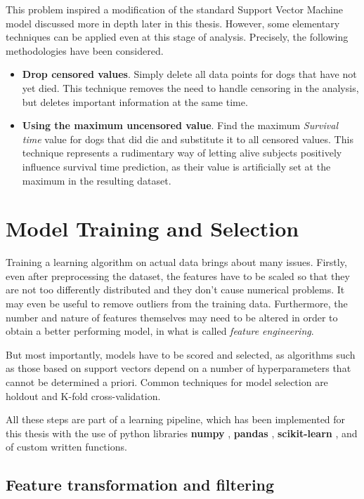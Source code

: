 \documentclass[12pt]{report}
\begin{document}
This problem inspired a modification of the standard Support Vector Machine model discussed more in depth later in this thesis. However, some elementary techniques can be applied even at this stage of analysis. Precisely, the following methodologies have been considered.
\begin{itemize}
\item \textbf{Drop censored values}. Simply delete all data points for dogs that have not yet died. This technique removes the need to handle censoring in the analysis, but deletes important information at the same time.
\item \textbf{Using the maximum uncensored value}. Find the maximum \textit{Survival time} value for dogs that did die and substitute it to all censored values. This technique represents a rudimentary way of letting alive subjects positively influence survival time prediction, as their value is artificially set at the maximum in the resulting dataset.
\end{itemize}

\chapter{Model Training and Selection}
\label{chmodsel}
Training a learning algorithm on actual data brings about many issues.
Firstly, even after preprocessing the dataset, the features have to be scaled so that they are not too differently distributed and they don't cause numerical problems. It may even be useful to remove outliers from the training data. Furthermore, the number and nature of features themselves may need to be altered in order to obtain a better performing model, in what is called \textit{feature engineering}.

But most importantly, models have to be scored and selected, as algorithms such as those based on support vectors depend on a number of hyperparameters that cannot be determined a priori. Common techniques for model selection are holdout and K-fold cross-validation.

All these steps are part of a learning pipeline, which has been implemented for this thesis with the use of python libraries \textbf{numpy} \cite{numpy}, \textbf{pandas} \cite{pandas}, \textbf{scikit-learn} \cite{sklearn}, and of custom written functions.

\section{Feature transformation and filtering}
\end{document}
